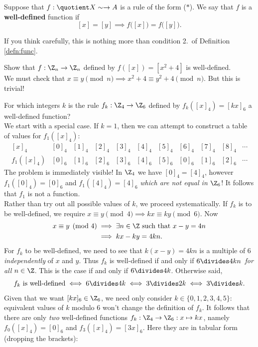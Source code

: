 \begin{defn}
Suppose that $f:\quotient X\sim\to A$ is a rule of the form ($\ast$). We say that $f$ is a \textbf{well-defined} function if
\[[x]=[y]\implies f\bigl([x]\bigr)=f\bigl([y]\bigr).\]
\end{defn}

\noindent If you think carefully, this is nothing more than condition 2.\ of Definition \ref{defn:func}.

\begin{examples}
	\item Show that $f:\Z_n\to\Z_n$ defined by $f([x])=[x^2+4]$ is well-defined.\\[5pt]
	We must check that $x\equiv y\pmod n\implies x^2+4\equiv y^2+4\pmod n$. But this is trivial!
	\item For which integers $k$ is the rule $f_k:\Z_4\to\Z_6$ defined by $f_k([x]_4)=[kx]_6$ a well-defined function?\\[5pt]
	We start with a special case. If $k=1$, then we can attempt to construct a table of values for $f_1([x]_4)$:
	\[\begin{array}{c|cccc|cccc|cc}
	[x]_4 & [0]_4 & [1]_4 & [2]_4 & [3]_4 & [4]_4 & [5]_4 & [6]_4 & [7]_4 & [8]_4 & \cdots\\\hline
	f_1([x]_4) & [0]_6 & [1]_6 & [2]_6 & [3]_6 & [4]_6 & [5]_6 & [0]_6 & [1]_6 & [2]_6 & \cdots
	\end{array}\]
	The problem is immediately visible! In $\Z_4$ we have $[0]_4 = [4]_4$, however $f_1([0]_4) = [0]_6$ and $f_1([4]_4) = [4]_6$ \emph{which are not equal in $\Z_6$}! It follows that $f_1$ is not a function.\\[5pt]
	Rather than try out all possible values of $k$, we proceed systematically. If $f_k$ is to be well-defined, we require $x\equiv y\pmod 4\implies kx\equiv ky\pmod 6$. Now
	\begin{align*}
	x\equiv y\pmod 4&\implies \exists n\in\Z\text{ such that }x-y=4n\\*
	&\implies kx-ky=4kn.
	\end{align*}
	For $f_k$ to be well-defined, we need to see that $k(x-y)=4kn$ is a multiple of 6 \emph{independently} of $x$ and $y$. Thus $f_k$ is well-defined if and only if $6\divides 4kn$\, \emph{for all} $n\in\Z$. This is the case if and only if $6\divides 4k$. Otherwise said,
	\[\text{$f_k$ is well-defined}\iff 6\divides 4k\iff 3\divides 2k\iff 3\divides k.\]
	Given that we want $[kx]_6\in\Z_6$, we need only consider $k\in\{0,1,2,3,4,5\}$: equivalent values of $k$ modulo 6 won't change the definition of $f_k$. It follows that there are only \emph{two} well-defined functions $f_k:\Z_4\to\Z_6:x\mapsto kx$, namely $f_0([x]_4) = [0]_6$ and $f_3([x]_4) = [3x]_6$. Here they are in tabular form (dropping the brackets):

\end{examples}

